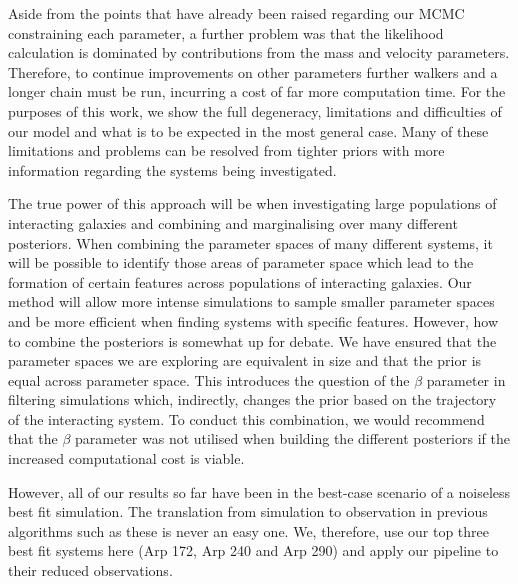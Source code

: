 Aside from the points that have already been raised regarding our MCMC constraining each parameter, a further problem was that the likelihood calculation is dominated by contributions from the mass and velocity parameters. Therefore, to continue improvements on other parameters further walkers and a longer chain must be run, incurring a cost of far more computation time. For the purposes of this work, we show the full degeneracy, limitations and difficulties of our model and what is to be expected in the most general case. Many of these limitations and problems can be resolved from tighter priors with more information regarding the systems being investigated.

The true power of this approach will be when investigating large populations of interacting galaxies and combining and marginalising over many different posteriors. When combining the parameter spaces of many different systems, it will be possible to identify those areas of parameter space which lead to the formation of certain features across populations of interacting galaxies. Our method will allow more intense simulations to sample smaller parameter spaces and be more efficient when finding systems with specific features. However, how to combine the posteriors is somewhat up for debate. We have ensured that the parameter spaces we are exploring are equivalent in size and that the prior is equal across parameter space. This introduces the question of the $\beta$ parameter in filtering simulations which, indirectly, changes the prior based on the trajectory of the interacting system. To conduct this combination, we would recommend that the $\beta$ parameter was not utilised when building the different posteriors if the increased computational cost is viable.

However, all of our results so far have been in the best-case scenario of a noiseless best fit simulation. The translation from simulation to observation in previous algorithms such as these is never an easy one. We, therefore, use our top three best fit systems here (Arp 172, Arp 240 and Arp 290) and apply our pipeline to their reduced observations.

